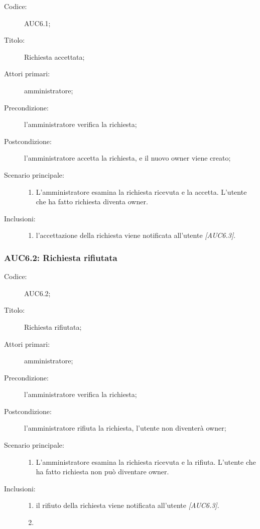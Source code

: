 \documentclass[../../../analisi-dei-requisiti.tex]{subfiles}
\begin{document}
\begin{description}
  \item[Codice:] AUC6.1;
  \item[Titolo:] Richiesta accettata;
  \item[Attori primari:] amministratore;
  \item[Precondizione:] l'amministratore verifica la richiesta;
  \item[Postcondizione:] l'amministratore accetta la richiesta, e il nuovo owner viene creato;
  \item[Scenario principale:]
  \begin{enumerate}
    \item L'amministratore esamina la richiesta ricevuta e la accetta. L'utente che ha fatto richiesta diventa owner.
  \end{enumerate}
  \item[Inclusioni:]
  \begin{enumerate}
    \item l'accettazione della richiesta viene notificata all'utente \emph{[AUC6.3]}.
  \end{enumerate}
\end{description}

\subsubsection{AUC6.2: Richiesta rifiutata}%
\label{subs:AUC6.2}

\begin{description}
  \item[Codice:] AUC6.2;
  \item[Titolo:] Richiesta rifiutata;
  \item[Attori primari:] amministratore;
  \item[Precondizione:] l'amministratore verifica la richiesta;
  \item[Postcondizione:] l'amministratore rifiuta la richiesta, l'utente non diventerà owner;
  \item[Scenario principale:]
  \begin{enumerate}
    \item L'amministratore esamina la richiesta ricevuta e la rifiuta. L'utente che ha fatto richiesta non può diventare owner.
  \end{enumerate}
  \item[Inclusioni:]
  \begin{enumerate}
    \item il rifiuto della richiesta viene notificata all'utente \emph{[AUC6.3]}.
    \item
  \end{enumerate}
\end{description}
\end{document}
